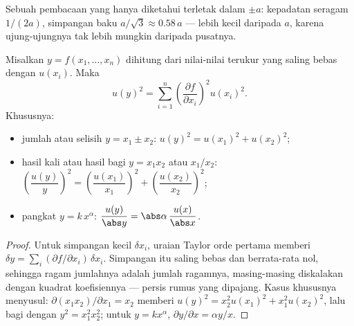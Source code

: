 \begin{omfigure}

{\small Sebuah pembacaan yang hanya diketahui terletak dalam $\pm a$:
kepadatan seragam $1/(2a)$, simpangan baku $a/\sqrt3 \approx 0.58\,a$
--- lebih kecil daripada $a$, karena ujung-ujungnya tak lebih mungkin
daripada pusatnya.}
\end{omfigure}

\begin{theorem}\label{thm:b1:units-dimensions:propagation}
Misalkan $y = f(x_1, \dots, x_n)$ dihitung dari nilai-nilai terukur
yang saling bebas dengan  $u(x_i)$. Maka
\[
u(y)^2 = \sum_{i=1}^n \left(\frac{\partial f}{\partial x_i}\right)^2 u(x_i)^2 .
\]
Khususnya:
\begin{itemize}
  \item jumlah atau selisih $y = x_1 \pm x_2$:
        $u(y)^2 = u(x_1)^2 + u(x_2)^2$;
  \item hasil kali atau hasil bagi $y = x_1 x_2$ atau $x_1/x_2$:
        $\left(\dfrac{u(y)}{y}\right)^2 = \left(\dfrac{u(x_1)}{x_1}\right)^2
        + \left(\dfrac{u(x_2)}{x_2}\right)^2$;
  \item pangkat $y = k\,x^\alpha$: $\dfrac{u(y)}{\abs y} = \abs\alpha\,\dfrac{u(x)}{\abs x}$.
\end{itemize}
\end{theorem}

\begin{proof}
Untuk simpangan kecil $\delta x_i$, uraian Taylor orde pertama memberi
$\delta y = \sum_i (\partial f/\partial x_i)\,\delta x_i$. Simpangan itu
saling bebas dan berrata-rata nol, sehingga ragam jumlahnya adalah
jumlah ragamnya, masing-masing diskalakan dengan kuadrat koefisiennya
--- persis rumus yang dipajang. Kasus khususnya menyusul:
$\partial(x_1 x_2)/\partial x_1 = x_2$ memberi
$u(y)^2 = x_2^2 u(x_1)^2 + x_1^2 u(x_2)^2$, lalu bagi dengan $y^2 = x_1^2 x_2^2$;
untuk $y = kx^\alpha$, $\partial y/\partial x = \alpha y/x$.
\end{proof}

